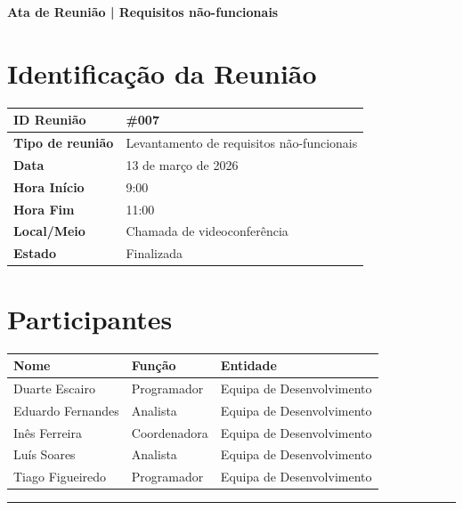 \documentclass[12pt]{article}
\begin{document}
{\noindent\LARGE\bfseries\color{primaryblue} Ata de Reunião | Requisitos não-funcionais}

\vspace{0.4cm}

\section*{Identificação da Reunião}

\begin{tabularx}{\textwidth}{|l|X|}
\hline
\rowcolor{tablegray}
\textbf{ID Reunião} & \#007 \\ \hline
\textbf{Tipo de reunião} & Levantamento de requisitos não-funcionais\\ \hline
\textbf{Data} & 13 de março de 2026 \\ \hline
\textbf{Hora Início} & 9:00 \\ \hline
\textbf{Hora Fim} & 11:00 \\ \hline
\textbf{Local/Meio} & Chamada de videoconferência \\ \hline
\textbf{Estado} & Finalizada \\ \hline
\end{tabularx}

\vspace{0.5cm}

\section*{Participantes}

\begin{tabularx}{\textwidth}{|l|l|X|}
\hline
\rowcolor{tablegray}
\textbf{Nome} & \textbf{Função} & \textbf{Entidade} \\ \hline
Duarte Escairo & Programador & Equipa de Desenvolvimento \\ \hline
Eduardo Fernandes & Analista & Equipa de Desenvolvimento \\ \hline
Inês Ferreira & Coordenadora & Equipa de Desenvolvimento \\ \hline
Luís Soares & Analista & Equipa de Desenvolvimento \\ \hline
Tiago Figueiredo & Programador & Equipa de Desenvolvimento \\ \hline
\end{tabularx}

\vspace{0.8cm}
\hrule %
	\vspace{0.2cm}
\end{document}
